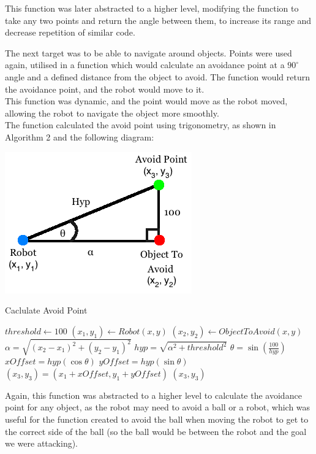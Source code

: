 This function was later abstracted to a higher level, modifying the function to take any two points and return the angle between them, to increase its range and decrease repetition of similar code. \linebreak

The next target was to be able to navigate around objects. Points were used again, utilised in a function which would calculate an avoidance point at a $90^{\circ}$ angle and a defined distance from the object to avoid. The function would return the avoidance point, and the robot would move to it. \\
This function was dynamic, and the point would move as the robot moved, allowing the robot to navigate the object more smoothly.\\
The function calculated the avoid point using trigonometry, as shown in Algorithm 2 and the following diagram:\\
\begin{center}
\includegraphics[scale=0.6]{images/AvoidPoints.png}\\
\end{center}

\begin{algorithm}
\caption{Caclulate Avoid Point}
\begin{algorithmic}[1]
\STATE $threshold \gets 100$
\STATE $(x_{1}, y_{1}) \gets Robot (x, y)$
\STATE $(x_{2}, y_{2}) \gets Object To Avoid (x, y)$
\STATE $\alpha = \sqrt{(x_{2} - x_{1})^{2} + (y_{2} - y_{1})^{2}}$
\STATE $hyp = \sqrt{\alpha^{2} + threshold^{2}}$
\STATE $\theta = \sin(\frac{100}{hyp})$
\STATE $xOffset = hyp(\cos\theta)$
\STATE $yOffset = hyp(\sin\theta)$
\STATE $(x_{3}, y_{3}) = (x_{1} + xOffset, y_{1} + yOffset)$
\RETURN $(x_{3}, y_{3})$
\end{algorithmic}
\end{algorithm}

Again, this function was abstracted to a higher level to calculate the avoidance point for any object, as the robot may need to avoid a ball or a robot, which was useful for the function created to avoid the ball when moving the robot to get to the correct side of the ball (so the ball would be between the robot and the goal we were attacking). \linebreak

